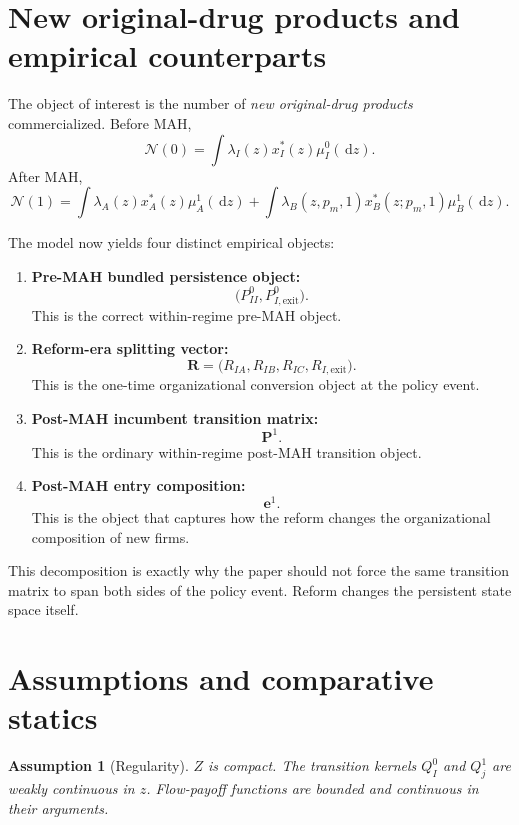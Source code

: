 \documentclass[12pt]{article}
\newtheorem{assumption}{Assumption}
\newcommand{\1}{\mathbf{1}}
\newcommand{\dd}{\,\mathrm{d}}
\newcommand{\Inew}{\mathcal{N}}
\begin{document}
\section{New original-drug products and empirical counterparts}

The object of interest is the number of \emph{new original-drug products} commercialized. Before MAH,
\begin{equation}
\Inew(0)=\int \lambda_I(z)x_I^*(z)\mu_I^0(\dd z).
\label{eq:Ipre}
\end{equation}
After MAH,
\begin{equation}
\Inew(1)=\int \lambda_A(z)x_A^*(z)\mu_A^1(\dd z)+\int \lambda_B(z,p_m,1)x_B^*(z;p_m,1)\mu_B^1(\dd z).
\label{eq:Ipost}
\end{equation}

The model now yields four distinct empirical objects:
\begin{enumerate}[leftmargin=2em]
    \item \textbf{Pre-MAH bundled persistence object:}
    \[
    \bigl(P_{II}^0,P_{I,\mathrm{exit}}^0\bigr).
    \]
    This is the correct within-regime pre-MAH object.
    \item \textbf{Reform-era splitting vector:}
    \[
    \mathbf R=\bigl(R_{IA},R_{IB},R_{IC},R_{I,\mathrm{exit}}\bigr).
    \]
    This is the one-time organizational conversion object at the policy event.
    \item \textbf{Post-MAH incumbent transition matrix:}
    \[
    \mathbf P^1.
    \]
    This is the ordinary within-regime post-MAH transition object.
    \item \textbf{Post-MAH entry composition:}
    \[
    \mathbf e^1.
    \]
    This is the object that captures how the reform changes the organizational composition of new firms.
\end{enumerate}

This decomposition is exactly why the paper should not force the same transition matrix to span both sides of the policy event. Reform changes the persistent state space itself.

\section{Assumptions and comparative statics}

\begin{assumption}[Regularity]
$Z$ is compact. The transition kernels $Q_I^0$ and $Q_j^1$ are weakly continuous in $z$. Flow-payoff functions are bounded and continuous in their arguments.
\end{assumption}
\end{document}
